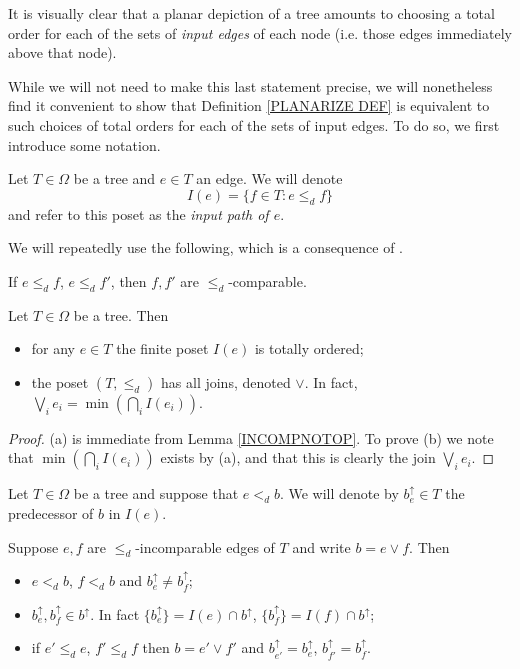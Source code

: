 \documentclass[a4paper,10pt]{article}%
\begin{document}
It is visually clear that a planar depiction of a tree amounts to choosing a total order for each of the sets of \textit{input edges} of each node (i.e. those edges immediately above that node).

While we will not need to make this last statement precise, we will nonetheless find it convenient to show that Definition \ref{PLANARIZE DEF} is equivalent to such choices of total orders for each of the sets of input edges.
To do so, we first introduce some notation.


\begin{notation}\label{INPUTPATH NOT}
	Let $T \in \Omega$ be a tree and $e \in T$ an edge. We will denote
	\[ I(e) =\{f \in T \colon e \leq_d f \} \]
and refer to this poset as the \textit{input path of $e$}.
\end{notation}

We will repeatedly use the following, which is a consequence of \cite[Cor. 5.26]{Pe17}.

\begin{lemma}\label{INCOMPNOTOP}
If $e \leq_d f$, $e \leq_d f'$, then $f,f'$ are $\leq_d$-comparable. 
\end{lemma}


\begin{proposition}\label{INPUTPATHS PROP}
	Let $T \in \Omega$ be a tree. Then
	\begin{itemize}
		\item[(a)] for any $e \in T$ the finite poset $I(e)$ is totally ordered;
		\item[(b)] the poset $(T,\leq_d)$ has all joins, denoted $\vee$. In fact, $\bigvee_{i} e_i = \min (\bigcap_{i} I(e_i))$.
	\end{itemize}
\end{proposition}

\begin{proof}
	(a) is immediate from Lemma \ref{INCOMPNOTOP}.
To prove (b) we note that 
	$\min (\bigcap_{i} I(e_i))$ exists by (a), and that this is clearly the join $\bigvee_i {e_i}$.
\end{proof}


\begin{notation}
	Let $T \in \Omega$ be a tree and suppose that $e <_d b$. We will denote by $b^{\uparrow}_e \in T$ the predecessor of $b$ in $I(e)$.
\end{notation}


\begin{proposition}\label{INPUTPREDECESSORPROP PROP}
Suppose $e,f$ are $\leq_d$-incomparable edges of $T$ and write $b= e \vee f$. Then
\begin{itemize}
\item [(a)] $e <_d b$, $f<_d b$ and $b^{\uparrow}_e \neq b^{\uparrow}_f$;
\item [(b)] $b^{\uparrow}_e, b^{\uparrow}_f \in b^{\uparrow}$. In fact $\{b^{\uparrow}_e\} = I(e) \cap b^{\uparrow}$,
$\{b^{\uparrow}_f\} = I(f) \cap b^{\uparrow}$;
\item[(c)] if $e' \leq_d e$, $f' \leq_d f$ then 
$b = e' \vee f'$ and $b^{\uparrow}_{e'} = b^{\uparrow}_{e}$, $b^{\uparrow}_{f'} = b^{\uparrow}_{f}$.
\end{itemize}
\end{proposition}
\end{document}
